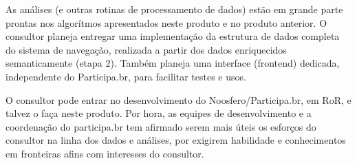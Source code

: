 \documentclass[12pt]{article}
\begin{document}
As análises (e outras rotinas de processamento de dados) estão em grande parte prontas nos algorítmos apresentados neste produto e no produto anterior. O consultor planeja entregar uma implementação da estrutura de dados completa do sistema de navegação, realizada a partir dos dados enriquecidos semanticamente (etapa 2). Também planeja uma interface (frontend) dedicada, independente do Participa.br, para facilitar testes e usos.

O consultor pode entrar no desenvolvimento do Noosfero/Participa.br, em RoR, e talvez o faça neste produto. Por hora, as equipes de desenvolvimento e a coordenação do participa.br tem afirmado serem mais úteis os esforços do consultor na linha dos dados e análises, por exigirem habilidade e conhecimentos em fronteiras afins com interesses do consultor.
\end{document}

